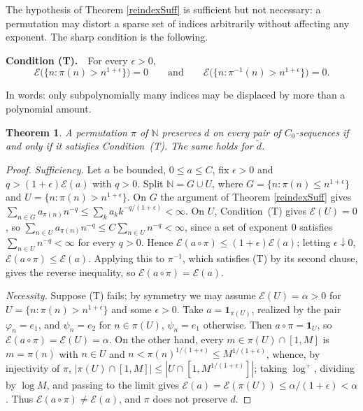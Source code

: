 \documentclass[twoside,11pt,letter]{article}
\def\bN{\mathbb{N}}
\newcommand{\cexp}{\mathcal{E}}  %
\newtheorem{theorem}{Theorem}[section]
\theoremstyle{definition}
\theoremstyle{definition}
\theoremstyle{plain}
\begin{document}
The hypothesis of Theorem \ref{reindexSuff} is sufficient but not necessary: a permutation may distort a sparse set of indices arbitrarily without affecting any exponent. The sharp condition is the following.

\medskip
\noindent\textbf{Condition (T).}\ \ For every $\epsilon>0$,
\begin{equation*}
\cexp\big(\{n:\pi(n)>n^{1+\epsilon}\}\big)=0
\qquad\text{and}\qquad
\cexp\big(\{n:\pi^{-1}(n)>n^{1+\epsilon}\}\big)=0.
\end{equation*}

\smallskip
\noindent In words: only subpolynomially many indices may be displaced by more than a polynomial amount.

\begin{theorem}\label{reindexSharp}
A permutation $\pi$ of $\bN$ preserves $d$ on every pair of $C_0$-sequences if and only if it satisfies Condition~\textup{(T)}. The same holds for $\tilde d$.
\end{theorem}
\begin{proof}
\emph{Sufficiency.} Let $a$ be bounded, $0\leq a\leq C$, fix $\epsilon>0$ and $q>(1+\epsilon)\cexp(a)$ with $q>0$. Split $\bN=G\cup U$, where $G=\{n:\pi(n)\leq n^{1+\epsilon}\}$ and $U=\{n:\pi(n)>n^{1+\epsilon}\}$. On $G$ the argument of Theorem \ref{reindexSuff} gives $\sum_{n\in G}a_{\pi(n)}n^{-q}\leq\sum_k a_k k^{-q/(1+\epsilon)}<\infty$. On $U$, Condition~(T) gives $\cexp(U)=0$, so $\sum_{n\in U}a_{\pi(n)}n^{-q}\leq C\sum_{n\in U}n^{-q}<\infty$, since a set of exponent $0$ satisfies $\sum_{n\in U}n^{-q}<\infty$ for every $q>0$. Hence $\cexp(a\circ\pi)\leq(1+\epsilon)\cexp(a)$; letting $\epsilon\downarrow0$, $\cexp(a\circ\pi)\leq\cexp(a)$. Applying this to $\pi^{-1}$, which satisfies (T) by its second clause, gives the reverse inequality, so $\cexp(a\circ\pi)=\cexp(a)$.

\emph{Necessity.} Suppose (T) fails; by symmetry we may assume $\cexp(U)=\alpha>0$ for $U=\{n:\pi(n)>n^{1+\epsilon}\}$ and some $\epsilon>0$. Take $a=\mathbf 1_{\pi(U)}$, realized by the pair $\varphi_n=e_1$, and $\psi_n=e_2$ for $n\in\pi(U)$, $\psi_n=e_1$ otherwise. Then $a\circ\pi=\mathbf 1_{U}$, so $\cexp(a\circ\pi)=\cexp(U)=\alpha$. On the other hand, every $m\in\pi(U)\cap[1,M]$ is $m=\pi(n)$ with $n\in U$ and $n<\pi(n)^{1/(1+\epsilon)}\leq M^{1/(1+\epsilon)}$, whence, by injectivity of $\pi$, $|\pi(U)\cap[1,M]|\leq|U\cap[1,M^{1/(1+\epsilon)}]|$; taking $\log^+$, dividing by $\log M$, and passing to the limit gives $\cexp(a)=\cexp(\pi(U))\leq\alpha/(1+\epsilon)<\alpha$. Thus $\cexp(a\circ\pi)\neq\cexp(a)$, and $\pi$ does not preserve $d$.
\end{proof}
\end{document}

